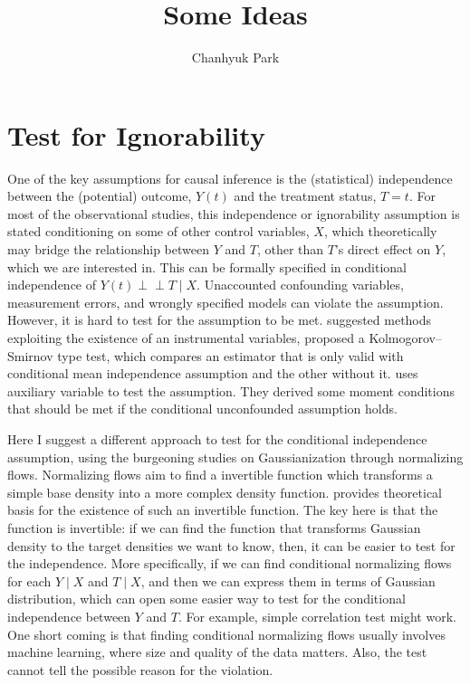 \documentclass[10pt]{extarticle}
\title{Some Ideas}
\author{Chanhyuk Park}
\date{}
\begin{document}
    \maketitle

\section{Test for Ignorability}
One of the key assumptions for causal inference is the (statistical) independence between the (potential) outcome, $Y(t)$ and the treatment status, $T = t$. For most of the observational studies, this independence or ignorability assumption is stated conditioning on some of other control variables, $X$, which theoretically may bridge the relationship between $Y$ and $T$, other than $T$'s direct effect on $Y$, which we are interested in. This can be formally specified in conditional independence of $Y(t) \perp\!\!\!\perp T \mid X$. Unaccounted confounding variables, measurement errors, and wrongly specified models can violate the assumption. However, it is hard to test for the assumption to be met. \citet{Donald2014a,Luna2014a} suggested methods exploiting the existence of an instrumental variables, \citet{Chen2018b} proposed a Kolmogorov–Smirnov type test, which compares an estimator that is only valid with conditional mean independence assumption and the other without it. \citet{Fang2020a} uses auxiliary variable to test the assumption. They derived some moment conditions that should be met if the conditional unconfounded assumption holds. 

Here I suggest a different approach to test for the conditional independence assumption, using the burgeoning studies on Gaussianization through normalizing flows. Normalizing flows aim to find a invertible function which transforms a simple base density into a more complex density function. \citet{Chen2000a} provides theoretical basis for the existence of such an invertible function. The key here is that the function is invertible: if we can find the function that transforms Gaussian density to the target densities we want to know, then, it can be easier to test for the independence. More specifically, if we can find conditional normalizing flows for each $Y \mid X$ and $T \mid X$, and then we can express them in terms of Gaussian distribution, which can open some easier way to test for the conditional independence between $Y$ and $T$. For example, simple correlation test might work. 
%
One short coming is that finding conditional normalizing flows usually involves machine learning, where size and quality of the data matters. Also, the test cannot tell the possible reason for the violation. 
\end{document}
